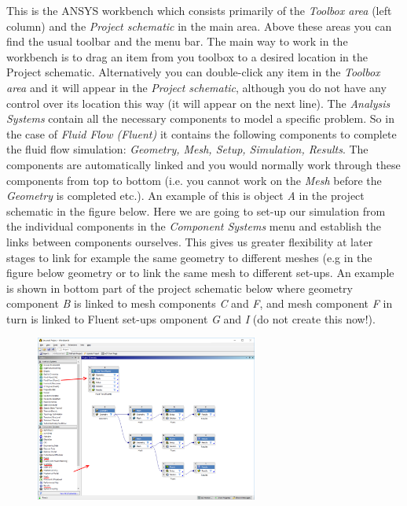 \documentclass[11pt,a4paper,oneside,hidelinks]{scrartcl}
\begin{document}
This is the ANSYS workbench which consists primarily of the \emph{Toolbox area} (left column) and the \emph{Project schematic} in the main area. Above these areas you can find the usual toolbar and the menu bar. The main way to work in the workbench is to drag an item from you toolbox to a desired location in the Project schematic. Alternatively you can double-click any item in the \emph{Toolbox area} and it will appear in the \emph{Project schematic}, although you do not have any control over its location this way (it will appear on the next line). The \emph{Analysis Systems} contain all the necessary components to model a specific problem. So in the case of \emph{Fluid Flow (Fluent)} it contains the following components to complete the fluid flow simulation: \emph{Geometry, Mesh, Setup, Simulation, Results}. The components are automatically linked and you would normally work through these components from top to bottom (i.e. you cannot work on the \emph{Mesh} before the \emph{Geometry} is completed etc.). An example of this is object \emph{A} in the project schematic in the figure below.
Here we are going to set-up our simulation from the individual components in the \emph{Component Systems} menu and establish the links between components ourselves. This gives us greater flexibility at later stages to link for example the same geometry to different meshes (e.g in the figure below geometry or to link the same mesh to different set-ups. An example is shown in bottom part of the project schematic below where geometry component \emph{B} is linked to mesh components \emph{C} and \emph{F}, and mesh component \emph{F} in turn is linked to Fluent set-ups omponent \emph{G} and \emph{I} (do not create this now!).

\begin{figure}[H]
\begin{center}
\includegraphics[width=0.65\textwidth,clip]{workbench_components.png}
\end{center}
\end{figure}
\end{document}
